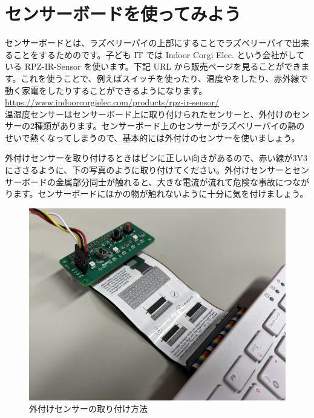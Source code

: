 \newpage
\section{センサーボードを使ってみよう}
センサーボードとは、ラズベリーパイの上部にすることでラズベリーパイで出来ることをするためのです。子ども IT では Indoor Corgi Elec. という会社がしている RPZ-IR-Sensor を使います。下記 URL から販売ページを見ることができます。これを使うことで、例えばスイッチを使ったり、温度やをしたり、赤外線で動く家電をしたりすることができるようになります。\\
\url{https://www.indoorcorgielec.com/products/rpz-ir-sensor/}\\


温湿度センサーはセンサーボード上に取り付けられたセンサーと、外付けのセンサーの2種類があります。センサーボード上のセンサーがラズベリーパイの熱のせいで熱くなってしまうので、基本的には外付けのセンサーを使いましょう。

外付けセンサーを取り付けるときはピンに正しい向きがあるので、赤い線が3V3にささるように、下の写真のように取り付けてください。外付けセンサーとセンサーボードの金属部分同士が触れると、大きな電流が流れて危険な事故につながります。センサーボードにほかの物が触れないように十分に気を付けましょう。

\begin{figure}[H]
    \centering
    \includegraphics[width=0.6\linewidth]{images/chap03/how_to_install_bme280.jpg}
    \caption{外付けセンサーの取り付け方法}
\end{figure}

